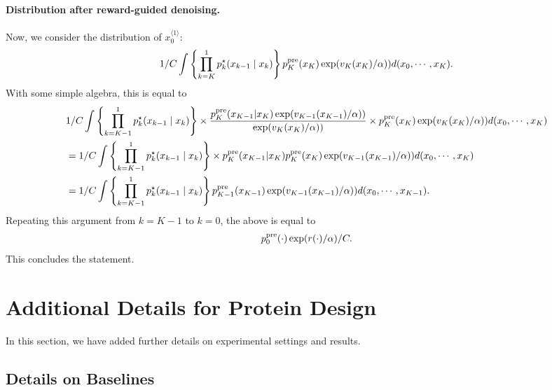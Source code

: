 \paragraph{Distribution after reward-guided denoising.} Now, we consider the distribution of $x^{\langle 1 \rangle}_0$: 
\begin{align*}
    1/C \int  \left\{ \prod_{k=K}^1 p^{\star}_k(x_{k-1} \mid x_k) \right \} p^{\mathrm{pre}}_K(x_K)\exp(v_K(x_K)/\alpha))  d(x_0,\cdots,x_K). 
\end{align*}
With some simple algebra, this is equal to 
\begin{align*} 
&  1/C  \int  \left\{ \prod_{k=K-1}^1 p^{\star}_k(x_{k-1} \mid x_k) \right \} \times \frac{p^{\mathrm{pre}}_K(x_{K-1}|x_{K})\exp(v_{K-1}(x_{K-1})/\alpha))}{\exp(v_{K}(x_{K})/\alpha))} \times  p^{\mathrm{pre}}_K(x_K)\exp(v_K(x_K)/\alpha))  d(x_0,\cdots,x_{K}) \\
& = 1/C  \int  \left\{ \prod_{k=K-1}^1 p^{\star}_k(x_{k-1} \mid x_k) \right \} \times  p^{\mathrm{pre}}_K(x_{K-1}|x_{K}) p^{\mathrm{pre}}_K(x_{K}) \exp(v_{K-1}(x_{K-1})/\alpha))    d(x_0,\cdots,x_{K}) \\
&= 1/C  \int  \left\{ \prod_{k=K-1}^1 p^{\star}_k(x_{k-1} \mid x_k) \right \} p^{\mathrm{pre}}_{K-1}(x_{K-1})\exp(v_{K-1}(x_{K-1})/\alpha))d(x_0,\cdots,x_{K-1}). 
\end{align*}
Repeating this argument from $k=K-1$ to $k=0$, the above is equal to 
\begin{align*}
       p^{\mathrm{pre}}_0(\cdot)\exp(r(\cdot)/\alpha)/C. 
\end{align*}
This concludes the statement. 

\section{Additional Details for Protein Design}\label{sec:appendix}

In this section, we have added further details on experimental settings and results. 

\subsection{Details on Baselines}

